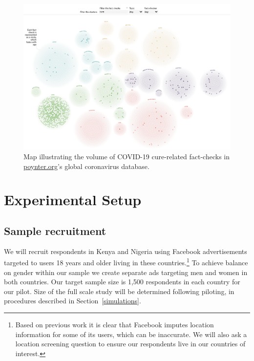 \documentclass[letterpaper, 12pt, parskip=full,]{scrartcl}
\begin{document}




\begin{figure}[t]
\centering
\caption{Map illustrating the volume of COVID-19 cure-related fact-checks in \url{poynter.org}'s global coronavirus database.}
\label{fig:poynter_cures}
\includegraphics[width=.95\textwidth]{poynter_cures.png} 
\end{figure}


\FloatBarrier
\section{Experimental Setup}



\subsection{Sample recruitment}
We will recruit respondents in Kenya and Nigeria using Facebook advertisements targeted to users 18 years and older living in these countries.\footnote{Based on previous work it is clear that Facebook imputes location information for some of its users, which can be inaccurate. We will also ask a location screening question to ensure our respondents live in our countries of interest.} %
To achieve balance on gender within our sample we create separate ads targeting men and women in both countries. Our target sample size is 1,500 respondents in each country for our pilot. Size of the full scale study will be determined following piloting, in procedures described in Section~\ref{simulations}.
\end{document}

